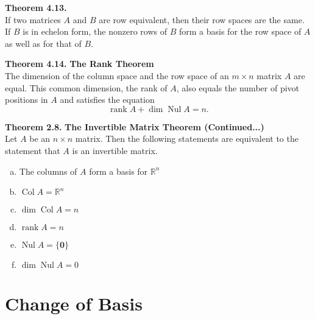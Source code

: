\documentclass[10pt]{book}
\newenvironment{boxthm}{\begin{mdframed}[backgroundcolor=gray!30,nobreak=true]}{\end{mdframed}}
\newcommand{\R}{\mathbb{R}}
\newcommand{\vect}[1]{\ensuremath{\boldsymbol{\mathbf{#1}}}}
\DeclareMathOperator{\Nul}{Nul}
\DeclareMathOperator{\Col}{Col}
\DeclareMathOperator{\rank}{rank}
\begin{document}
\begin{boxthm}
	\textbf{Theorem 4.13.} \\
	If two matrices $A$ and $B$ are row equivalent, then their row spaces are the same. If $B$ is in echelon form, the nonzero rows of $B$ form a basis for the row space of $A$ as well as for that of $B$.
\end{boxthm}
\begin{boxthm}
	\textbf{Theorem 4.14.}
	\textbf{The Rank Theorem} \\
	The dimension of the column space and the row space of an $m\times n$ matrix $A$ are equal. This common dimension, the rank of $A$, also equals the number of pivot positions in $A$ and satisfies the equation
	$$ \rank A + \dim\Nul A = n. $$
\end{boxthm}
\begin{boxthm}
	\textbf{Theorem 2.8.}
	\textbf{The Invertible Matrix Theorem (Continued...)} \\
	Let $A$ be an $n\times n$ matrix. Then the following statements are equivalent to the statement that $A$ is an invertible matrix.
	\begin{enumerate}[(a)]\itemsep0em
		\setcounter{enumi}{12}
		\item The columns of $A$ form a basis for $\R^n$
		\item $\Col A = \R^n$
		\item $\dim\Col A = n$
		\item $\rank A = n$
		\item $\Nul A = \{\vect{0}\}$
		\item $\dim\Nul A = 0$
	\end{enumerate}
\end{boxthm}


\newpage


\section{Change of Basis}
\end{document}
